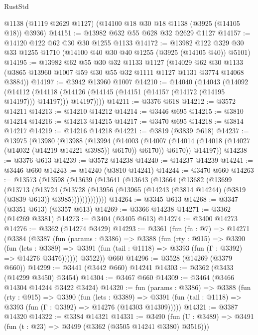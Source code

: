 \begin{lexlean}{RustStd}
\begin{coremodule}
    @1138
    (@1119 @2629 @1127)
    (@14100 @18 @30 @18 @1138 (@3925 (@14105 @18)) @3936)
@14151 := @13982 @632 @55 @628 @32 @2629 @1127
@14157 := @14120 @122 @62 @30 @30 @1255 @1133
@14172 := @13982 @122 @329 @30 @33 @1255 @1710 (@14100 @40 @30 @40 @1255 (@3925 (@14105 @40)) @5101)
@14195 := @13982
    @62
    @55
    @30
    @32
    @1133
    @1127
    (@14029 @62 @30 @1133 (@3865 @13960 @1007 @59 @30 @55 @32 @1111 @1127 @1131 @3774 @14068 @3884))
@14197 := @3942 @13960 @1007
@14210 := @14040
    (@14043
      (@14092
        (@14112
          (@14118 (@14126 (@14145 (@14151 (@14157 (@14172 (@14195 @14197))) @14197))) @14197))))
@14211 := @3376 @618
@14212 := @3572 @14211
@14213 := @14210 @14212
@14214 := @3446 @695
@14215 := @3810 @14214
@14216 := @14213 @14215
@14217 := @3470 @695
@14218 := @3814 @14217
@14219 := @14216 @14218
@14221 := @3819 (@3839 @618)
@14237 := @13975
    (@13980
      (@13988
        (@13994
          (@14003
            (@14007 (@14014 (@14018 (@14027 (@14032 (@14219 @14221 @3985)) @6170)) @6170))
            @6170))
        @14197))
@14238 := @3376 @613
@14239 := @3572 @14238
@14240 := @14237 @14239
@14241 := @3446 @660
@14243 := @14240 (@3810 @14241)
@14244 := @3470 @660
@14263 := @13573
    (@13598
      (@13639
        (@13641
          (@13643
            (@13664
              (@13682
                (@13699
                  (@13713
                    (@13724
                      (@13728
                        (@13956
                          (@13965 (@14243 (@3814 @14244) (@3819 (@3839 @613)) @3985)))))))))))))
@14264 := @3345 @613
@14268 := @3347 (@3351 @613) (@3357 @613)
@14269 := @3366 @14238
@14271 := @3362 (@14269 @3381)
@14273 := @3404 (@3405 @613)
@14274 := @3400 @14273
@14276 := @3362 (@14274 @3429)
@14293 := @3361
    (fun (fn : @7) =>
    @14271
      (@3384
        (@3387
          (fun (params : @3386) =>
          @3388
            (fun (rty : @915) =>
            @3390
              (fun (lets : @3389) =>
              @3391 (fun (tail : @1118) => @3393 (fun (Γ : @3392) => @14276 @3476))))))
        @3522))
    @660
@14296 := @3528 (@14269 (@3379 @660))
@14299 := @3441 (@3442 @660) @14241
@14303 := @3362 (@3433 (@14299 @3450) @3454)
@14304 := @3467 @660
@14309 := @3464 (@3466 @14304 @14244 @3422 @3424)
@14320 := fun (params : @3386) =>
  @3388
    (fun (rty : @915) =>
    @3390
      (fun (lets : @3389) =>
      @3391 (fun (tail : @1118) => @3393 (fun (Γ : @3392) => @14276 (@14303 @14309)))))
@14321 := @3387 @14320
@14322 := @3384 @14321
@14331 := @3490
    (fun (U : @3489) => @3491 (fun (t : @23) => @3499 (@3362 (@3505 @14241 @3380) @3516)))

\end{coremodule}
\end{lexlean}
